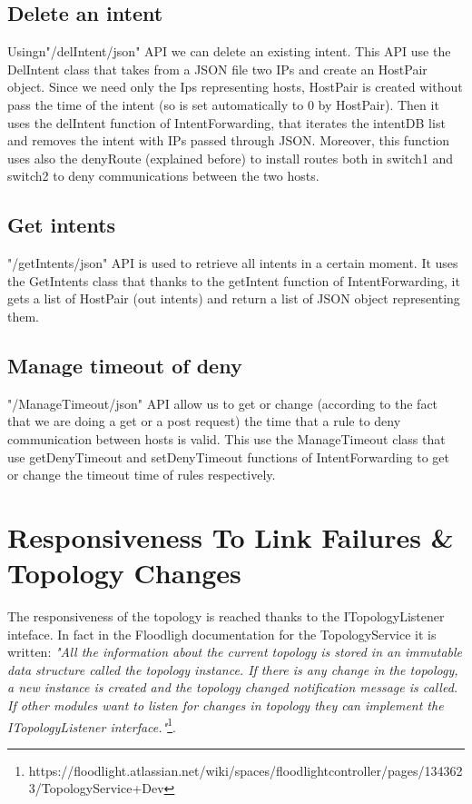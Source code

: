 \documentclass[a4paper]{report}
\begin{document}
	\subsection{Delete an intent}
	\noindent Usingn"/delIntent/json" API we can delete an existing intent. This API use the DelIntent class that takes from a JSON file two IPs and create an HostPair object. Since we need only the Ips representing hosts, HostPair is created without pass the time of the intent (so is set automatically to 0 by HostPair). Then it uses the delIntent function of IntentForwarding, that iterates the intentDB list and removes the intent with IPs passed through JSON. Moreover, this function uses also the denyRoute (explained before) to install routes both in switch1 and switch2 to deny communications between the two hosts.
        
        \subsection{Get intents}
        \noindent "/getIntents/json" API is used to retrieve all intents in a certain moment. It uses the GetIntents class that thanks to the getIntent function of IntentForwarding, it gets a list of HostPair (out intents) and return a list of JSON object representing them.

	\subsection{Manage timeout of deny}
        \noindent "/ManageTimeout/json" API allow us to get or change (according to the fact that we are doing a get or a post request) the time that a rule to deny communication between hosts is valid. This use the ManageTimeout class that use getDenyTimeout and setDenyTimeout functions of IntentForwarding to get or change the timeout time of rules respectively.

	
	\section{Responsiveness To Link Failures \& Topology Changes}
	The responsiveness of the topology is reached thanks to the ITopologyListener inteface. In fact in the Floodligh documentation for the TopologyService it is written: \textit{"All the information about the current topology is stored in an immutable data structure called the topology instance. If there is any change in the topology, a new instance is created and the topology changed notification message is called. If other modules want to listen for changes in topology they can implement the ITopologyListener interface."}\footnote{https://floodlight.atlassian.net/wiki/spaces/floodlightcontroller/pages/1343623/TopologyService+Dev}.
	
\end{document}
